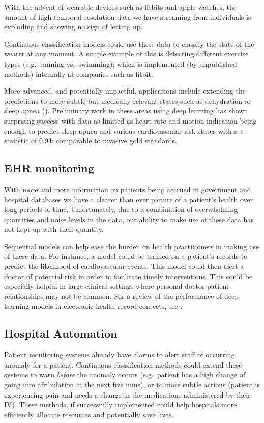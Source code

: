 \documentclass[]{book}
\theoremstyle{definition}
\theoremstyle{definition}
\theoremstyle{definition}
\theoremstyle{remark}
\begin{document}
With the advent of wearable devices such as fitbits and apple watches,
the amount of high temporal resolution data we have streaming from
individuals is exploding and showing no sign of letting up.

Continuous classification models could use these data to classify the
state of the wearer at any moment. A simple example of this is detecting
different exercise types (e.g.~running vs.~swimming); which is
implemented (by unpublished methods) internally at companies such as
fitbit.

More advanced, and potentially impactful, applications include extending
the predictions to more subtle but medically relevant states such as
dehydration or sleep apnea (\citet{wearable_atrial}). Preliminary work
in these areas using deep learning has shown surprising success with
data as limited as heart-rate and motion indication being enough to
predict sleep apnea and various cardiovascular risk states with a
c-statistic of 0.94: comparable to invasive gold standards.

\subsection{EHR monitoring}\label{ehr-monitoring}

With more and more information on patients being accrued in government
and hospital databases we have a clearer than ever picture of a
patient's health over long periods of time. Unfortunately, due to a
combination of overwhelming quantities and noise levels in the data, our
ability to make use of these data has not kept up with their quantity.

Sequential models can help ease the burden on health practitioners in
making use of these data. For instance, a model could be trained on a
patient's records to predict the likelihood of cardiovascular events.
This model could then alert a doctor of potential risk in order to
facilitate timely interventions. This could be especially helpful in
large clinical settings where personal doctor-patient relationships may
not be common. For a review of the performance of deep learning models
in electronic health record contects, see \citet{deep_ehr}.

\subsection{Hospital Automation}\label{hospital-automation}

Patient monitoring systems already have alarms to alert staff of
occurring anomaly for a patient. Continuous classification methods could
extend these systems to warn \emph{before} the anomaly occurs
(e.g.~patient has a high change of going into afribulation in the next
five mins), or to more subtle actions (patient is experiencing pain and
needs a change in the medications administered by their IV). These
methods, if successfully implemented could help hospitals more
efficiently allocate resources and potentially save lives.
\end{document}
